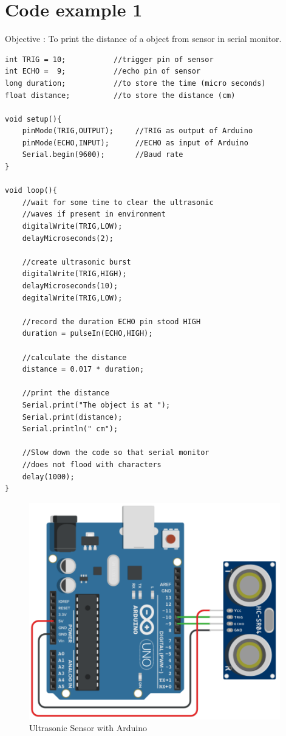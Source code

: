 \section{\textbf{Code example 1}}
\par Objective : To print the distance of a object from sensor in serial monitor.

\begin{lstlisting}[style=CStyle]
int TRIG = 10;           //trigger pin of sensor
int ECHO =  9;           //echo pin of sensor
long duration;           //to store the time (micro seconds)
float distance;          //to store the distance (cm)

void setup(){
    pinMode(TRIG,OUTPUT);     //TRIG as output of Arduino
    pinMode(ECHO,INPUT);      //ECHO as input of Arduino
    Serial.begin(9600);       //Baud rate
}

void loop(){
    //wait for some time to clear the ultrasonic
    //waves if present in environment
    digitalWrite(TRIG,LOW);
    delayMicroseconds(2);
    
    //create ultrasonic burst
    digitalWrite(TRIG,HIGH);
    delayMicroseconds(10);
    degitalWrite(TRIG,LOW);
    
    //record the duration ECHO pin stood HIGH
    duration = pulseIn(ECHO,HIGH);
    
    //calculate the distance
    distance = 0.017 * duration;
    
    //print the distance
    Serial.print("The object is at ");
    Serial.print(distance);
    Serial.println(" cm");
    
    //Slow down the code so that serial monitor
    //does not flood with characters
    delay(1000);					
}
\end{lstlisting}

\begin{figure}[h!]	
	\centering
	\includegraphics[width=4.3in]{Images/Ultrasonic/circuit1.png}
    \caption{Ultrasonic Sensor with Arduino}
\end{figure}

